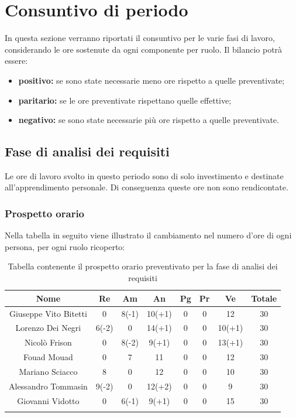 \section{Consuntivo di periodo}
		In questa sezione verranno riportati il consuntivo per le varie fasi di lavoro, considerando le ore sostenute da ogni componente per ruolo. Il bilancio potrà essere:
		\begin{itemize}
			\item \textbf{positivo:} se sono state necessarie meno ore rispetto a quelle preventivate;	 
			\item \textbf{paritario:} se le ore preventivate rispettano quelle effettive;	 
			\item \textbf{negativo:} se sono state necessarie più ore rispetto a quelle preventivate.
		\end{itemize}
	\subsection{Fase di analisi dei requisiti}
		Le ore di lavoro svolto in questo periodo sono di solo investimento e destinate all'apprendimento personale. Di conseguenza queste ore non sono rendicontate. 
		\subsubsection{Prospetto orario}
			Nella tabella in seguito viene illustrato il cambiamento nel numero d'ore di ogni persona, per ogni ruolo ricoperto:
			
			\begin{longtable}{|c|c|c|c|c|c|c|c}
				\hline
				\rowcolor{lighter-grayer}
				\textbf{Nome} & \textbf{Re} & \textbf{Am} & \textbf{An} & \textbf{Pg}  & \textbf{Pr}   & \textbf{Ve} & \textbf{Totale} \\
				\hline
				\endfirsthead
				
				\hline
				Giuseppe Vito Bitetti 		& 0 & 8(-1) & 10(+1) & 0 & 0 & 12 & 30\\
				\hline
				\hline
				Lorenzo Dei Negri			 & 6(-2) & 0 & 14(+1) & 0 & 0 & 10(+1) & 30\\
				\hline
				\hline
				Nicolò Frison 					& 0 & 8(-2) & 9(+1) & 0 & 0 & 13(+1) & 30\\
				\hline
				\hline
				Fouad Mouad 				& 0 & 7 & 11 & 0 & 0 & 12 & 30\\
				\hline
				\hline
				Mariano Sciacco 			& 8 & 0 & 12 & 0 & 0 & 10 & 30\\
				\hline
				\hline
				Alessandro Tommasin    & 9(-2) & 0 & 12(+2) & 0 & 0 & 9 & 30\\
				\hline
				\hline
				Giovanni Vidotto 			& 0 & 6(-1) & 9(+1) & 0 & 0 & 15 & 30\\
				\hline 
				\caption{Tabella contenente il prospetto orario preventivato per la fase di analisi dei requisiti}
			\end{longtable}
			\pagebreak	
			

